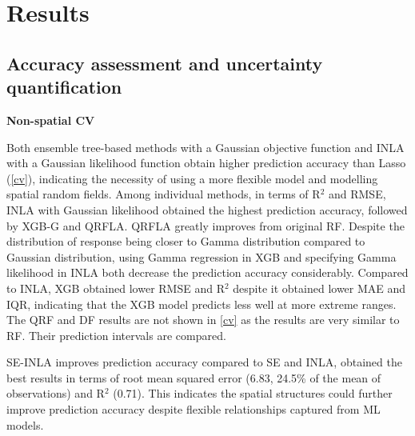 \documentclass{article}
\begin{document}



\section{Results}
\subsection{Accuracy assessment and uncertainty quantification}

\textbf{Non-spatial CV}

Both ensemble tree-based methods with a Gaussian objective function and INLA with a Gaussian likelihood function obtain higher prediction accuracy than Lasso (\cref{cv}), indicating the necessity of using a more flexible model and modelling spatial random fields. Among individual methods, in terms of R$^2$ and RMSE, INLA with Gaussian likelihood obtained the highest prediction accuracy, followed by XGB-G and QRFLA. QRFLA greatly improves from original RF. Despite the distribution of response being closer to Gamma distribution compared to Gaussian distribution, using Gamma regression in XGB and specifying Gamma likelihood in INLA both decrease the prediction accuracy considerably. Compared to INLA, XGB obtained lower RMSE and R$^2$ despite it obtained lower MAE and IQR, indicating that the XGB model predicts less well at more extreme ranges. The QRF and DF results are not shown in \cref{cv} as the results are very similar to RF. Their prediction intervals are compared. 

 
SE-INLA improves prediction accuracy compared to SE and INLA, obtained the best results in terms of root mean squared error (6.83, 24.5\% of the mean of observations) and R$^2$ (0.71). This indicates the spatial structures could further improve prediction accuracy despite flexible relationships captured from ML models.
 
\end{document}
